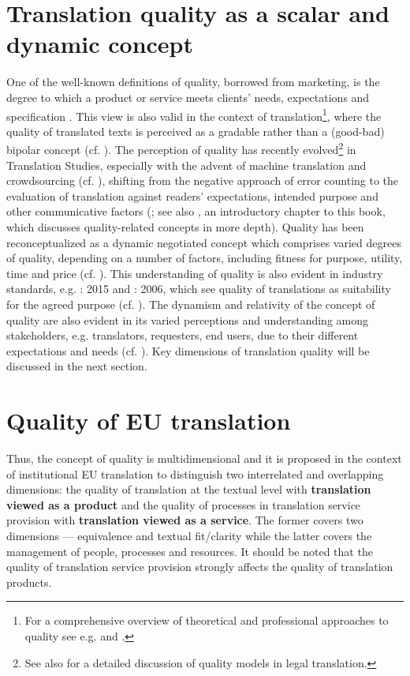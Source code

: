 \documentclass[output=paper]{langsci/langscibook}
\begin{document}
\section{Translation quality as a scalar and dynamic concept}\label{sec:biel:2}

One of the well-known definitions of quality, borrowed from marketing, is the degree to which a product or service meets clients’ needs, expectations and specification \citep[146-148]{Kotler2006}. This view is also valid in the context of translation\footnote{For a comprehensive overview of theoretical and professional approaches to quality see e.g. \citet{Drugan2013} and \citet{House2015}.}, where the quality of translated texts is perceived as a gradable rather than a (good-bad) bipolar concept (cf. \citealt[15]{Biel2011a}). The perception of quality has recently evolved\footnote{See also  \citet{PrietoRamos2015} for a detailed discussion of quality models in legal translation.} in Translation Studies, especially with the advent of machine translation and crowdsourcing (cf. \citealt{Jiménez-Crespo2017}), shifting from the negative approach of error counting to the evaluation of translation against readers’ expectations, intended purpose and other communicative factors (\citealt[238]{Colina2009}; see also \citealt{Vandepitte2017}, an introductory chapter to this book, which discusses quality-related concepts in more depth). Quality has been reconceptualized as a dynamic negotiated concept which comprises varied degrees of quality, depending on a number of factors, including fitness for purpose, utility, time and price (cf. \citealt[478, 482]{Jiménez-Crespo2017}). This understanding of quality is also evident in industry standards, e.g. \citeauthor{ISO2015}: 2015 and \citeauthor{EN2006}: 2006, which see quality of translations as suitability for the agreed purpose (cf. \citealt{Biel2011b}). The dynamism and relativity of the concept of quality are also evident in its varied perceptions and understanding among stakeholders, e.g. translators, requesters, end users, due to their different expectations and needs (cf. \citealt[142-143]{Strandvik2015}). Key dimensions of translation quality will be discussed in the next section. 

\section{Quality of EU translation}\label{sec:biel:3} 

Thus, the concept of quality is multidimensional and it is proposed in the context of institutional EU translation to distinguish two interrelated and overlapping dimensions: the quality of translation at the textual level with \textbf{translation viewed as a product} and the quality of processes in translation service provision with \textbf{translation viewed as a service}. The former covers two dimensions — equivalence and textual fit/clarity while the latter covers the management of people, processes and resources. It should be noted that the quality of translation service provision strongly affects the quality of translation products.
\end{document}
